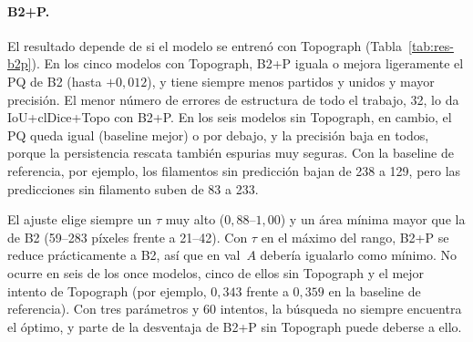 \paragraph{B2+P.} El resultado depende de si el modelo se entrenó con
Topograph (Tabla~\ref{tab:res-b2p}). En los cinco modelos con Topograph,
B2+P iguala o mejora ligeramente el PQ de B2 (hasta $+0{,}012$), y tiene
siempre menos partidos y unidos y mayor precisión. El menor número de
errores de estructura de todo el trabajo, 32, lo da IoU+clDice+Topo con
B2+P. En los seis modelos sin Topograph, en cambio, el PQ queda igual
(baseline mejor) o por debajo, y la precisión baja en todos, porque la
persistencia rescata también espurias muy seguras. Con la baseline de
referencia, por ejemplo, los filamentos sin predicción bajan de 238 a
129, pero las predicciones sin filamento suben de 83 a 233.

El ajuste elige siempre un $\tau$ muy alto ($0{,}88$--$1{,}00$) y un área
mínima mayor que la de B2 (59--283 píxeles frente a 21--42). Con $\tau$
en el máximo del rango, B2+P se reduce prácticamente a B2, así que en
val~$A$ debería igualarlo como mínimo. No ocurre en seis de los once
modelos, cinco de ellos sin Topograph y el mejor intento de Topograph
(por ejemplo, $0{,}343$ frente a $0{,}359$ en la baseline de
referencia). Con tres parámetros y 60 intentos, la búsqueda no siempre
encuentra el óptimo, y parte de la desventaja de B2+P sin Topograph
puede deberse a ello.

